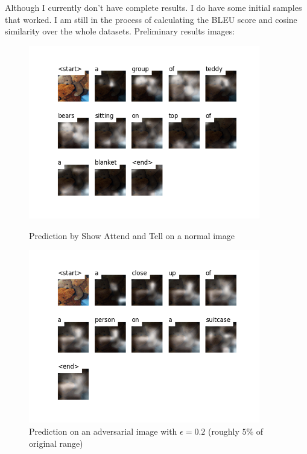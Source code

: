 Although I currently don't have complete results. I do have some initial samples that worked. I am still in the process of calculating the BLEU score and cosine similarity over the whole datasets.
Preliminary results images:

\begin{figure}
    \centering
    \begin{minipage}{0.45\textwidth}
        \centering
        \includegraphics[width=0.9\textwidth]{figures/caption_teddy_normal.png} %
        \caption{Prediction by Show Attend and Tell on a normal image}
    \end{minipage}\hfill
    \begin{minipage}{0.45\textwidth}
        \centering
        \includegraphics[width=0.9\textwidth]{figures/caption_teddy_adversarial_0.2.png} %
        \caption{Prediction on an adversarial image with $\epsilon=0.2$ (roughly $5\%$ of original range)}
    \end{minipage}
\end{figure}

